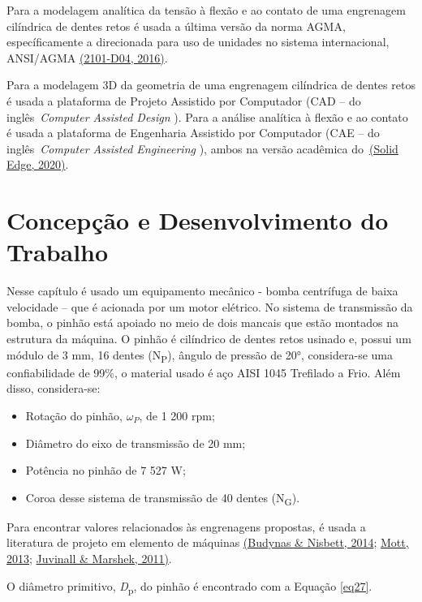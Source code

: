 \documentclass[12pt,a4paper]{article}
\providecommand{\tightlist}{\setlength{\itemsep}{0pt}\setlength{\parskip}{0pt}}%
\begin{document}
Para a modelagem analítica da tensão à flexão e ao contato de uma
engrenagem cilíndrica de dentes retos é usada a última versão da norma
AGMA, específicamente a direcionada para uso de unidades no sistema
internacional, ANSI/AGMA \hyperref[csl:5]{(2101-D04, 2016)}.

Para a modelagem 3D da geometria de uma engrenagem cilíndrica de dentes
retos é usada a plataforma de Projeto Assistido por Computador (CAD --
do inglês~\emph{Computer Assisted Design} ). Para a análise analítica à
flexão e ao contato é usada a plataforma de Engenharia Assistido por
Computador (CAE -- do inglês~\emph{Computer Assisted Engineering} ),
ambos na versão acadêmica do~\hyperref[csl:28]{(Solid Edge, 2020)}.

\section*{Concepção e Desenvolvimento do
Trabalho}

{\label{concepuxe7uxe3o-e-desenvolvimento-do-trabalho}}

Nesse capítulo é usado um equipamento mecânico - bomba centrífuga de
baixa velocidade -- que é acionada por um motor elétrico. No sistema de
transmissão da bomba, o pinhão está apoiado no meio de dois mancais que
estão montados na estrutura da máquina. O pinhão é cilíndrico de dentes
retos usinado e, possui um módulo de 3 mm, 16 dentes
(N\textsubscript{P}), ângulo de pressão de 20°, considera-se uma
confiabilidade de 99\%, o material usado é aço AISI 1045 Trefilado a
Frio. Além disso, considera-se:

\begin{itemize}
\tightlist
\item
  Rotação do pinhão, $\omega_P$, de 1 200 rpm;
\item
  Diâmetro do eixo de transmissão de 20 mm;
\item
  Potência no pinhão de 7 527 W;
\item
  Coroa desse sistema de transmissão de 40 dentes (N\textsubscript{G}).
\end{itemize}

Para encontrar valores relacionados às engrenagens propostas, é usada a
literatura de projeto em elemento de máquinas \hyperref[csl:20]{(Budynas \& Nisbett, 2014}; \hyperref[csl:21]{Mott, 2013}; \hyperref[csl:27]{Juvinall \& Marshek, 2011)}.

O diâmetro primitivo, \emph{D}\textsubscript{p}, do pinhão é encontrado
com a Equação {\ref{eq27}}.
\end{document}
